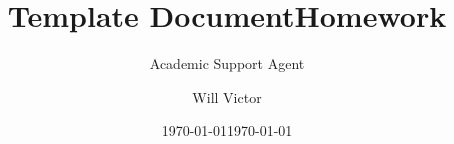 \documentclass{article}
\title{Template Document}
\author{Academic Support Agent}
\date{\today}
\begin{document}
\maketitle

\title{Homework}
\author{Will Victor}
\date{\today}
\maketitle
\end{document}
